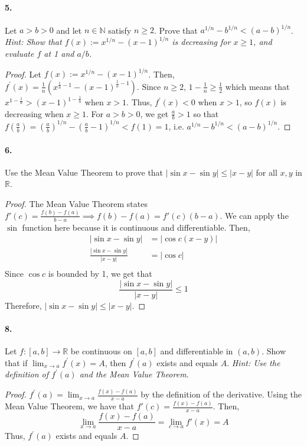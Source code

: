 \documentclass[12pt]{article}
\theoremstyle{remark}
\begin{document}
\paragraph{5.} Let $a>b>0$ and let $n \in \mathbb{N}$ satisfy $n \geq 2$. Prove that $a^{1 / n}-b^{1 / n}<(a-b)^{1 / n}$. \emph{Hint: Show that $f(x):=x^{1 / n}-(x-1)^{1 / n}$ is decreasing for $x \geq 1$, and evaluate $f$ at 1 and $a / b$.}
\begin{proof}
    Let $f(x):=x^{1 / n}-(x-1)^{1 / n}$. Then, $f^{\prime}(x)=\frac{1}{n}(x^{\frac{1}{n}-1}-(x-1)^{\frac{1}{n}-1})$. Since $n \geq 2$, $1-\frac{1}{n} \geq \frac{1}{2}$ which means that $x^{1-\frac{1}{n}}>(x-1)^{1-\frac{1}{n}}$ when $x>1$. Thus, $f^{\prime}(x)<0$ when $x>1$, so $f(x)$ is decreasing when $x \geq 1$. For $a>b>0$, we get $\frac{a}{b}>1$ so that $f(\frac{a}{b})=(\frac{a}{b})^{1 / n}-(\frac{a}{b}-1)^{1 / n}<f(1)=1$, i.e. $a^{1 / n}-b^{1 / n}<(a-b)^{1 / n}$.
\end{proof}

\paragraph{6.} Use the Mean Value Theorem to prove that $|\sin x-\sin y| \leq |x-y|$ for all $x, y$ in $\mathbb{R}$.
\begin{proof}
    The Mean Value Theorem states $f'(c) = \frac{f(b) - f(a)}{b - a} \implies f(b) - f(a) = f'(c)(b - a)$. We can apply the $\sin$ function here because it is continuous and differentiable. Then,
    \begin{align*}
        |\sin x - \sin y| &= |\cos c (x - y)| \\
        \frac{|\sin x - \sin y|}{|x - y|} &= |\cos c| \\
    \end{align*}
    Since $\cos c$ is bounded by 1, we get that $$\frac{|\sin x - \sin y|}{|x - y|} \leq 1$$ Therefore, $|\sin x - \sin y| \leq |x - y|$.
\end{proof}

\paragraph{8.} Let $f:[a, b] \rightarrow \mathbb{R}$ be continuous on $[a, b]$ and differentiable in $(a, b)$. Show that if $\lim _{x \rightarrow a} f^{\prime}(x)=A$, then $f^{\prime}(a)$ exists and equals $A$. \emph{Hint: Use the definition of $f^{\prime}(a)$ and the Mean Value Theorem.}
\begin{proof}
    $f^{\prime}(a) = \lim_{x \to a} \frac{f(x) - f(a)}{x - a}$ by the definition of the derivative. Using the Mean Value Theorem, we have that $f'(c) = \frac{f(x) - f(a)}{x - a}$. Then, $$\lim_{x \to a} \frac{f(x) - f(a)}{x - a} = \lim_{c \to a} f'(x) = A$$
    Thus, $f^{\prime}(a)$ exists and equals $A$.
\end{proof}
\end{document}
